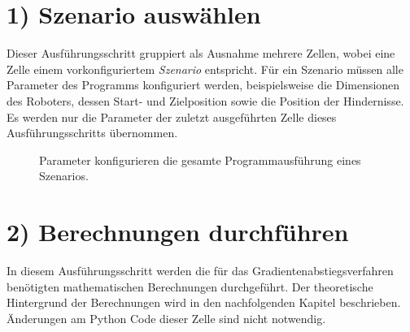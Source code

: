 \section*{1) Szenario auswählen}
\enlargethispage{1.5cm}
Dieser Ausführungsschritt gruppiert als Ausnahme mehrere Zellen, wobei eine Zelle einem vorkonfiguriertem \textit{Szenario} entspricht. Für ein Szenario müssen alle Parameter des Programms konfiguriert werden, beispielsweise die Dimensionen des Roboters, dessen Start- und Zielposition sowie die Position der Hindernisse. Es werden nur die Parameter der zuletzt ausgeführten Zelle dieses Ausführungsschritts übernommen.
\begin{figure}[H]
	\centering
	\footnotesize
	\centerline{}
	\vspace*{-0.2cm}
	\caption{Parameter konfigurieren die gesamte Programmausführung eines Szenarios.}
\end{figure}

\section*{2) Berechnungen durchführen}
In diesem Ausführungsschritt werden die für das Gradientenabstiegsverfahren benötigten mathematischen Berechnungen durchgeführt. Der theoretische Hintergrund der Berechnungen wird in den nachfolgenden Kapitel beschrieben. Änderungen am Python Code dieser Zelle sind nicht notwendig.

